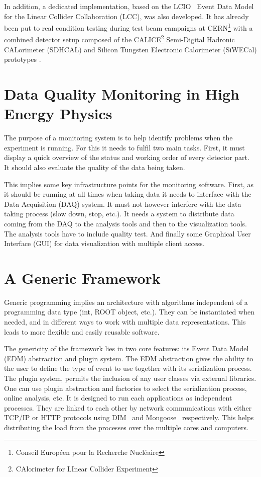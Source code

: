 \documentclass[conference]{IEEEtran}
\begin{document}
In addition, a dedicated implementation, based on the LCIO~\cite{LCIO} Event Data Model for the Linear Collider Collaboration (LCC), was also developed. It has already been put to real condition testing during test beam campaigns at CERN\footnote{Conseil Européen pour la Recherche Nucléaire} with a combined detector setup composed of the CALICE\footnote{CAlorimeter for LInear Collider Experiment} Semi-Digital Hadronic CALorimeter (SDHCAL) and Silicon Tungsten Electronic Calorimeter (SiWECal) prototypes .

\section{Data Quality Monitoring in High Energy Physics}
The purpose of a monitoring system is to help identify problems when the experiment is running. For this it needs to fulfil two main tasks. First, it must display a quick overview of the status and working order of every detector part. It should also evaluate the quality of the data being taken.

This implies some key infrastructure points for the monitoring software. First, as it should be running at all times when taking data it needs to interface with the Data Acquisition (DAQ) system. It must not however interfere with the data taking process (slow down, stop, etc.). It needs a system to distribute data coming from the DAQ to the analysis tools and then to the visualization tools. The analysis tools have to include quality test. And finally some Graphical User Interface (GUI) for data visualization with multiple client access.

\section{A Generic Framework}

Generic programming implies an architecture with algorithms independent of a programming data type (int, ROOT object, etc.). They can be instantiated when needed, and in different ways to work with multiple data representations. This leads to more flexible and easily reusable software.

The genericity of the framework lies in two core features: its Event Data Model (EDM) abstraction and plugin system.
The EDM abstraction gives the ability to the user to define the type of event to use together with its serialization process. The plugin system, permits the inclusion of any user classes via external libraries. One can use plugin abstraction and factories to select the serialization process, online analysis, etc.
It is designed to run each applications as independent processes. They are linked to each other by network communications with either TCP/IP or HTTP protocols using DIM~\cite{DIM} and Mongoose~\cite{MONGOOSE} respectively. This helps distributing the load from the processes over the multiple cores and computers.
\end{document}
